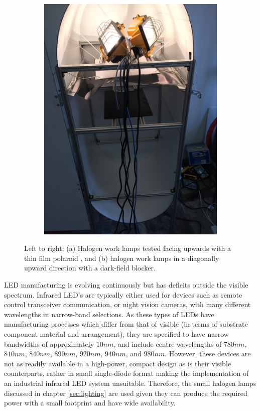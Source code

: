 \documentclass[fleqn,twoside,12pt]{report}
\begin{document}
\begin{figure}[h]
\begin{subfigure}{.45\textwidth}
		\includegraphics[width=\linewidth,angle=270,origin=c]{bench_hal_film2.jpg}
		\caption{}
		\label{fig:bench_hal_film2}
	\end{subfigure}%
	\caption{Left to right: (a) Halogen work lamps tested facing upwards with a thin film polaroid , and (b) halogen work lamps in a diagonally upward direction with a dark-field blocker.}
	\label{fig:test3}
\end{figure}


LED manufacturing is evolving continuously but has deficits outside the visible spectrum. Infrared LED's are typically either used for devices such as remote control transceiver communication, or night vision cameras, with many different wavelengths in narrow-band selections. As these types of LEDs have manufacturing processes which differ from that of visible (in terms of substrate component material and arrangement), they are specified to have narrow bandwidths of approximately $10nm$, and include centre wavelengths of $780nm$, $810nm$, $840nm$, $890nm$, $920nm$, $940nm$, and $980nm$. However, these devices are not as readily available in a high-power, compact design as is their visible counterparts, rather in small single-diode format making the implementation of an industrial infrared LED system unsuitable. Therefore, the small halogen lamps discussed in chapter \ref{sec:lighting} are used given they can produce the required power with a small footprint and have wide availability. 
\end{document}
